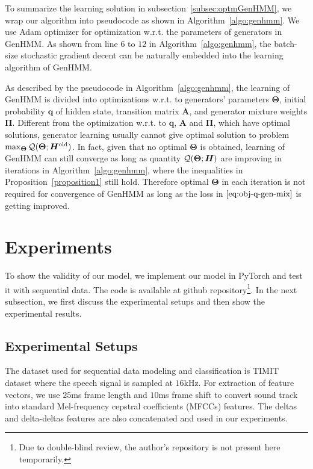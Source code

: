 \documentclass[letterpaper]{article} %
\begin{document}
To summarize the learning solution in subsection~\ref{subsec:optmGenHMM}, we wrap our algorithm into pseudocode as shown in Algorithm~\ref{algo:genhmm}. We use Adam \cite{DBLP:journals/corr/KingmaB14} optimizer for optimization w.r.t. the parameters of generators in GenHMM. As shown from line $6$ to $12$ in Algorithm~\ref{algo:genhmm}, the batch-size stochastic gradient decent can be naturally embedded into the learning algorithm of GenHMM.

As described by the pseudocode in Algorithm~\ref{algo:genhmm}, the learning of GenHMM is divided into optimizations w.r.t. to generators' parameters $\bm{\Theta}$, initial probability $\bm{q}$ of hidden state, transition matrix $\bm{A}$, and generator mixture weights $\bm{\Pi}$. Different from the optimization w.r.t. to $\bm{q}$, $\bm{A}$ and $\bm{\Pi}$, which have optimal solutions, generator learning usually cannot give optimal solution to problem $\max_{\bm{\Theta}} \mathcal{Q}(\bm{\Theta}; \bm{H}^{\mathrm{old}})$. In fact, given that no optimal $\bm{\Theta}$ is obtained, learning of GenHMM can still converge as long as quantity $\mathcal{Q}(\bm{\Theta}; \bm{H})$ are improving in iterations in Algorithm~\ref{algo:genhmm}, where the inequalities in Proposition~\ref{proposition1} still hold. Therefore optimal $\bm{\Theta}$ in each iteration is not required for convergence of GenHMM as long as the loss in $\eqref{eq:obj-q-gen-mix}$ is getting improved.




\section{Experiments}
To show the validity of our model, we implement our model in PyTorch and test it with sequential data. The code is available at github repository\footnote{Due to double-blind review, the author's repository is not present here temporarily.}. In the next subsection, we first discuss the experimental setups and then show the experimental results.

\subsection{Experimental Setups}
The dataset used for sequential data modeling and classification is TIMIT dataset where the speech signal is sampled at $16$kHz. For extraction of feature vectors, we use $25$ms frame length and $10$ms frame shift to convert sound track into standard Mel-frequency cepstral coefficients (MFCCs) features. The deltas and delta-deltas features are also concatenated and used in our experiments.
\end{document}
